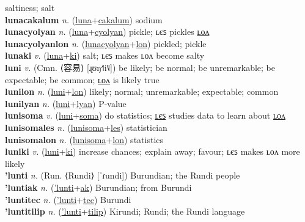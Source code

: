 saltiness; salt \label{lunalyan} \\
\textbf{lunacakalum} \textit{n.} (\hyperref[luna]{luna}+\hyperref[cakalum]{cakalum})
sodium \label{lunacakalum} \\
\textbf{lunacyolyan} \textit{n.} (\hyperref[luna]{luna}+\hyperref[cyolyan]{cyolyan})
pickle; ʟєꜱ pickles \hyperref[lunacyolyanlon]{ʟᴏᴧ} \label{lunacyolyan} \\
\textbf{lunacyolyanlon} \textit{n.} (\hyperref[lunacyolyan]{lunacyolyan}+\hyperref[lon]{lon})
pickled; pickle \label{lunacyolyanlon} \\
\textbf{lunaki} \textit{v.} (\hyperref[luna]{luna}+\hyperref[ki]{ki})
salt; ʟєꜱ makes ʟᴏᴧ become salty \label{lunaki} \\
\textbf{luni} \textit{v.} (Cmn. ⟨容易⟩ [ɻʊŋ˧˥i˥˩])
be likely; be normal; be unremarkable; be expectable; be common; \hyperref[lunilon]{ʟᴏᴧ} is likely true \label{luni} \\
\textbf{lunilon} \textit{n.} (\hyperref[luni]{luni}+\hyperref[lon]{lon})
likely; normal; unremarkable; expectable; common \label{lunilon} \\
\textbf{lunilyan} \textit{n.} (\hyperref[luni]{luni}+\hyperref[lyan]{lyan})
P-value \label{lunilyan} \\
\textbf{lunisoma} \textit{v.} (\hyperref[luni]{luni}+\hyperref[soma]{soma})
do statistics; \hyperref[lunisomales]{ʟєꜱ} studies data to learn about \hyperref[lunisomalon]{ʟᴏᴧ} \label{lunisoma} \\
\textbf{lunisomales} \textit{n.} (\hyperref[lunisoma]{lunisoma}+\hyperref[les]{les})
statistician \label{lunisomales} \\
\textbf{lunisomalon} \textit{n.} (\hyperref[lunisoma]{lunisoma}+\hyperref[lon]{lon})
statistics \label{lunisomalon} \\
\textbf{luniki} \textit{v.} (\hyperref[luni]{luni}+\hyperref[ki]{ki})
increase chances; explain away; favour; ʟєꜱ makes ʟᴏᴧ more likely \label{luniki} \\
\textbf{'lunti} \textit{n.} (Run. ⟨Rundi⟩ [ˈɾundi])
Burundian; the Rundi people \label{'lunti} \\
\textbf{'luntiak} \textit{n.} (\hyperref['lunti]{'lunti}+\hyperref[ak]{ak})
Burundian; from Burundi \label{'luntiak} \\
\textbf{'luntitec} \textit{n.} (\hyperref['lunti]{'lunti}+\hyperref[tec]{tec})
Burundi \label{'luntitec} \\
\textbf{'luntitilip} \textit{n.} (\hyperref['lunti]{'lunti}+\hyperref[tilip]{tilip})
Kirundi; Rundi; the Rundi language \label{'luntitilip} \\
